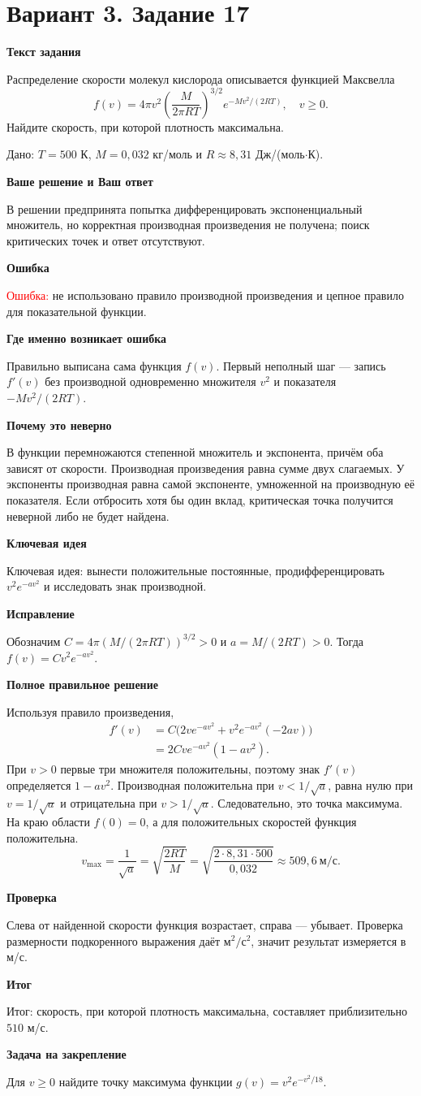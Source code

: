 \documentclass[11pt,a4paper]{article}
\newcommand{\Part}[1]{\par\medskip\noindent\textbf{#1}\par\smallskip}
\newcommand{\Task}[2]{\clearpage\phantomsection\label{task:#1}\section*{#2}}
\newcommand{\Err}[1]{\textcolor{red}{Ошибка:} #1}
\newcommand{\Idea}[1]{\textcolor{blue!60!black}{Ключевая идея:} #1}
\newcommand{\Result}[1]{\textcolor{teal!60!black}{Итог:} #1}
\begin{document}
\Task{v317}{Вариант 3. Задание 17}
\Part{Текст задания}
Распределение скорости молекул кислорода описывается функцией Максвелла
\[f(v)=4\pi v^2\!\left(\frac M{2\pi RT}\right)^{3/2}e^{-Mv^2/(2RT)},\quad v\ge0.\]
Найдите скорость, при которой плотность максимальна.\par Дано: $T=500$ К, $M=0{,}032$ кг/моль и $R\approx8{,}31$ Дж/(моль$\cdot$К).
\Part{Ваше решение и Ваш ответ}
В решении предпринята попытка дифференцировать экспоненциальный множитель, но корректная производная произведения не получена; поиск критических точек и ответ отсутствуют.
\Part{Ошибка}
\Err{не использовано правило производной произведения и цепное правило для показательной функции.}
\Part{Где именно возникает ошибка}
Правильно выписана сама функция $f(v)$. Первый неполный шаг --- запись $f'(v)$ без производной одновременно множителя $v^2$ и показателя $-Mv^2/(2RT)$.
\Part{Почему это неверно}
В функции перемножаются степенной множитель и экспонента, причём оба зависят от скорости. Производная произведения равна сумме двух слагаемых. У экспоненты производная равна самой экспоненте, умноженной на производную её показателя. Если отбросить хотя бы один вклад, критическая точка получится неверной либо не будет найдена.
\Part{Ключевая идея}
\Idea{вынести положительные постоянные, продифференцировать $v^2e^{-av^2}$ и исследовать знак производной.}
\Part{Исправление}
Обозначим $C=4\pi(M/(2\pi RT))^{3/2}>0$ и $a=M/(2RT)>0$. Тогда $f(v)=Cv^2e^{-av^2}$.
\Part{Полное правильное решение}
Используя правило произведения,
\[\begin{aligned}
f'(v)&=C\bigl(2ve^{-av^2}+v^2e^{-av^2}(-2av)\bigr)\\
&=2Cve^{-av^2}(1-av^2).
\end{aligned}\]
При $v>0$ первые три множителя положительны, поэтому знак $f'(v)$ определяется $1-av^2$. Производная положительна при $v<1/\sqrt a$, равна нулю при $v=1/\sqrt a$ и отрицательна при $v>1/\sqrt a$. Следовательно, это точка максимума. На краю области $f(0)=0$, а для положительных скоростей функция положительна.
\[v_{\max}=\frac1{\sqrt a}=\sqrt{\frac{2RT}{M}}=\sqrt{\frac{2\cdot8{,}31\cdot500}{0{,}032}}\approx509{,}6\ \text{м/с}.\]
\Part{Проверка}
Слева от найденной скорости функция возрастает, справа --- убывает. Проверка размерности подкоренного выражения даёт $\text{м}^2/\text{с}^2$, значит результат измеряется в м/с.
\Part{Итог}
\Result{скорость, при которой плотность максимальна, составляет приблизительно $510$ м/с.}
\Part{Задача на закрепление}
Для $v\ge0$ найдите точку максимума функции $g(v)=v^2e^{-v^2/18}$.
\end{document}
